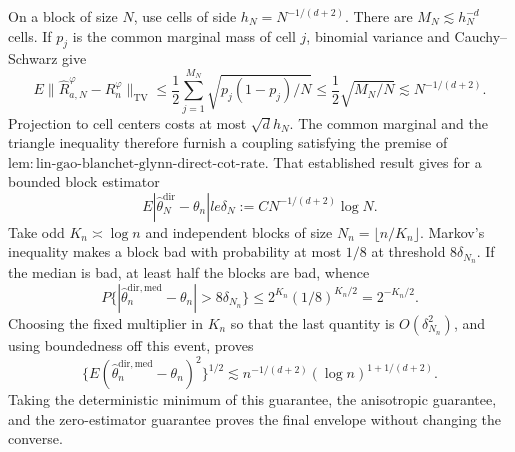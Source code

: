 On a block of size \(N\), use cells of side \(h_N=N^{-1/(d+2)}\). There are \(M_N\lesssim h_N^{-d}\) cells. If \(p_j\) is the common marginal mass of cell \(j\), binomial variance and Cauchy--Schwarz give
\[
E\|\widehat R_{a,N}^{\varphi}-R_n^\varphi\|_{\mathrm{TV}}
\le\frac12\sum_{j=1}^{M_N}\sqrt{p_j(1-p_j)/N}
\le\frac12\sqrt{M_N/N}\lesssim N^{-1/(d+2)}.                        \tag{7}
\]
Projection to cell centers costs at most \(\sqrt d h_N\). The common marginal and the triangle inequality therefore furnish a coupling satisfying the premise of \(\mathrm{lem{:}lin\text{-}gao\text{-}blanchet\text{-}glynn\text{-}direct\text{-}cot\text{-}rate}\). That established result gives for a bounded block estimator
\[
E|\widehat\theta_N^{\mathrm{dir}}-\theta_n|le\delta_N:=CN^{-1/(d+2)}\log N. \tag{8}
\]
Take odd \(K_n\asymp\log n\) and independent blocks of size \(N_n=\lfloor n/K_n\rfloor\). Markov's inequality makes a block bad with probability at most \(1/8\) at threshold \(8\delta_{N_n}\). If the median is bad, at least half the blocks are bad, whence
\[
P\{|\widehat\theta_n^{\mathrm{dir,med}}-\theta_n|>8\delta_{N_n}\}
\le2^{K_n}(1/8)^{K_n/2}=2^{-K_n/2}.                                  \tag{9}
\]
Choosing the fixed multiplier in \(K_n\) so that the last quantity is \(O(\delta_{N_n}^2)\), and using boundedness off this event, proves
\[
\{E(\widehat\theta_n^{\mathrm{dir,med}}-\theta_n)^2\}^{1/2}
\lesssim n^{-1/(d+2)}(\log n)^{1+1/(d+2)}.
\]
Taking the deterministic minimum of this guarantee, the anisotropic guarantee, and the zero-estimator guarantee proves the final envelope without changing the converse.